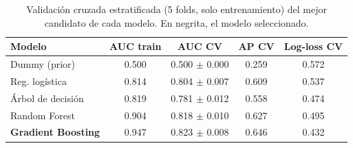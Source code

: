 \begin{table}[!t]
\centering
\footnotesize
\caption{Validación cruzada estratificada (5 folds, solo entrenamiento) del mejor candidato de cada modelo. En negrita, el modelo seleccionado.}
\label{tab:cv}
\setlength{\tabcolsep}{4pt}
\begin{tabular}{lcccc}
\toprule
Modelo & AUC train & AUC CV & AP CV & Log-loss CV \\
\midrule
Dummy (prior) & 0.500 & 0.500 $\pm$ 0.000 & 0.259 & 0.572 \\
Reg. logística & 0.814 & 0.804 $\pm$ 0.007 & 0.609 & 0.537 \\
Árbol de decisión & 0.819 & 0.781 $\pm$ 0.012 & 0.558 & 0.474 \\
Random Forest & 0.904 & 0.818 $\pm$ 0.010 & 0.627 & 0.495 \\
\textbf{Gradient Boosting} & 0.947 & 0.823 $\pm$ 0.008 & 0.646 & 0.432 \\
\bottomrule
\end{tabular}
\end{table}

